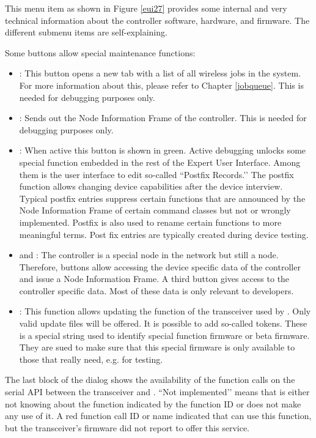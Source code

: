 {This menu item as shown in Figure \ref{eui27} provides some internal and very technical 
information about the \zway controller software, hardware, and firmware. The different 
submenu items are self-explaining.

Some buttons allow special maintenance functions:

\begin{itemize}

\item {}: This button opens a new tab with a list of all wireless jobs in 
the system. For more information about this, please refer to Chapter \ref{jobqueue}. 
This is needed for debugging purposes only.
\item {}: Sends out the Node Information Frame of the \zway controller. 
This is needed for debugging purposes only.
\item {}: When active this button is shown in green. Active debugging unlocks 
some special function embedded in the rest of the Expert User Interface. Among them is the 
user interface to edit so-called ``Postfix Records.’’ The postfix function allows changing 
device capabilities after the device interview. Typical postfix entries suppress certain 
functions that are announced by the Node Information Frame of certain command classes but 
not or wrongly implemented. Postfix is also used to rename certain functions to more 
meaningful terms. Post fix entries are typically created during device testing.
\item {} and : The controller is a 
special node in the network but still a node. Therefore, buttons allow accessing the device 
specific data of the controller and issue a Node Information Frame. A third button gives 
access to the controller specific data. Most of these data is only relevant to developers.

\item {}: This function allows updating the function of the \zwave 
transceiver used by \zway. Only valid update files will be offered. It is possible to 
add so-called tokens. These is a special string used to identify special function 
firmware or beta firmware. They are sued to make sure that this special firmware is only 
available to those that really need, e.g. for testing.
\end{itemize}


The last block of the dialog shows the availability of the function calls on the serial 
API between the \zwave transceiver and \zway. ``Not implemented’’ means that \zway is 
either not knowing about the function indicated by the function ID or does not make any 
use of it. A red function call ID or name indicated that \zway can use this function, but 
the transceiver’s firmware did not report to offer this service.

}
